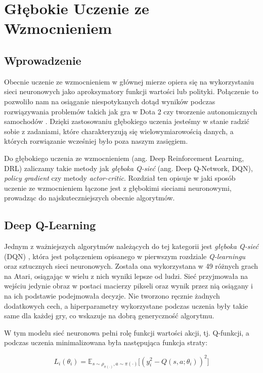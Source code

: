 \documentclass[licencjacka]{pracamgr}
\begin{document}
\chapter{Głębokie Uczenie ze Wzmocnieniem}

\section{Wprowadzenie}

Obecnie uczenie ze wzmocnieniem w głównej mierze opiera się na wykorzystaniu sieci neuronowych jako aproksymatory funkcji wartości lub polityki. Połączenie to pozwoliło nam na osiąganie niespotykanych dotąd wyników podczas rozwiązywania problemów takich jak gra w Dota 2 \cite{dota2} czy tworzenie autonomicznych samochodów \cite{sdc1, sdc2}. Dzięki zastosowaniu głębokiego uczenia jesteśmy w stanie radzić sobie z zadaniami, które charakteryzują się wielowymiarowością danych, a których rozwiązanie wcześniej było poza naszym zasięgiem.

Do głębokiego uczenia ze wzmocnieniem (ang. Deep Reinforcement Learning, DRL) zaliczamy takie metody jak \emph{głęboka Q-sieć} (ang. Deep Q-Network, DQN),  \emph{policy gradient} czy metody \emph{actor-critic}. Rozdział ten opisuje w jaki sposób uczenie ze wzmocnieniem łączone jest z głębokimi sieciami neuronowymi, prowadząc do najskuteczniejszych obecnie algorytmów. 

\section{Deep Q-Learning}

Jednym z ważniejszych algorytmów należących do tej kategorii jest \emph{głęboka Q-sieć} (DQN) \cite{dqn}, która jest połączeniem opisanego w pierwszym rozdziale \emph{Q-learningu} \cite{Q-learning} oraz sztucznych sieci neuronowych. Została ona wykorzystana w 49 różnych grach na Atari, osiągając w wielu z nich wyniki lepsze od ludzi. Sieć przyjmowała na wejściu jedynie obraz w postaci macierzy pikseli oraz wynik przez nią osiągany i na ich podstawie podejmowała decyzje. Nie tworzono ręcznie żadnych dodatkowych cech, a hiperparametry wykorzystane podczas uczenia były takie same dla każdej gry, co wskazuje na dobrą generyczność algorytmu.

W tym modelu sieć neuronowa pełni rolę funkcji wartości akcji, tj. Q-funkcji, a podczas uczenia minimalizowana była następująca funkcja straty:

$$ L_i(\theta_i) = \mathbb{E}_{s \sim \rho_{\pi(\cdot)}, a \sim \pi(\cdot)} \Big[ (y_i^2 - Q(s, a; \theta_i))^2 \Big] $$
\end{document}

